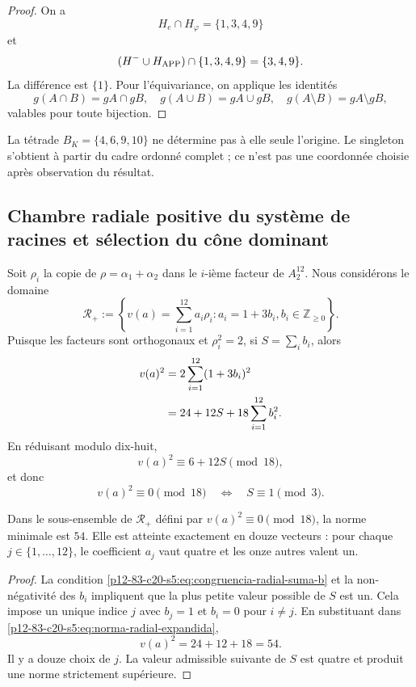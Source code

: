 \begin{proof}
On a
\[
 H_e\cap H_\varphi=\{1,3,4,9\}
\]
et
\[
 (H^-\cup H_{\rm APP})\cap\{1,3,4,9\}=\{3,4,9\}.
\]
La différence est \(\{1\}\). Pour l'équivariance, on applique les
identités
\[
 g(A\cap B)=gA\cap gB,
 \quad
 g(A\cup B)=gA\cup gB,
 \quad
 g(A\setminus B)=gA\setminus gB,
\]
valables pour toute bijection.
\end{proof}

La tétrade \(B_K=\{4,6,9,10\}\) ne détermine pas à elle seule l'origine. Le
singleton s'obtient à partir du cadre ordonné complet ; ce n'est pas une coordonnée
choisie après observation du résultat.

\subsection{Chambre radiale positive du système de racines et sélection du cône dominant}

Soit \(\rho_i\) la copie de \(\rho=\alpha_1+\alpha_2\) dans le
\(i\)-ième facteur de \(A_2^{12}\). Nous considérons le domaine
\begin{equation}
 \mathscr R_+
 :=\left\{
 v(a)=\sum_{i=1}^{12}a_i\rho_i:
 a_i=1+3b_i, b_i\in\mathbb Z_{\geq0}
 \right\}.
 \label{p12-83-c20-s5:eq:camara-radial-positiva}
\end{equation}
Puisque les facteurs sont orthogonaux et \(\rho_i^2=2\), si
\(S=\sum_i b_i\), alors
\begin{align}
 v(a)^2
 &=2\sum_{i=1}^{12}(1+3b_i)^2\notag\\
 &=24+12S+18\sum_{i=1}^{12}b_i^2.
 \label{p12-83-c20-s5:eq:norma-radial-expandida}
\end{align}
En réduisant modulo dix-huit,
\[
 v(a)^2\equiv6+12S\pmod{18},
\]
et donc
\begin{equation}
 v(a)^2\equiv0\pmod{18}
 \quad\Longleftrightarrow\quad
 S\equiv1\pmod3.
 \label{p12-83-c20-s5:eq:congruencia-radial-suma-b}
\end{equation}

\begin{proposition}
\label{p12-83-c20-s5:prop:minimos-camara-radial}
Dans le sous-ensemble de \(\mathscr R_+\) défini par
\(v(a)^2\equiv0\pmod{18}\), la norme minimale est \(54\). Elle est atteinte
exactement en douze vecteurs : pour chaque \(j\in\{1,\ldots,12\}\), le
coefficient \(a_j\) vaut quatre et les onze autres valent un.
\end{proposition}

\begin{proof}
La condition \eqref{p12-83-c20-s5:eq:congruencia-radial-suma-b} et la non-négativité des
\(b_i\) impliquent que la plus petite valeur possible de \(S\) est un. Cela
impose un unique indice \(j\) avec \(b_j=1\) et \(b_i=0\) pour
\(i\neq j\). En substituant dans \eqref{p12-83-c20-s5:eq:norma-radial-expandida},
\[
 v(a)^2=24+12+18=54.
\]
Il y a douze choix de \(j\). La valeur admissible suivante de \(S\) est
quatre et produit une norme strictement supérieure.
\end{proof}

